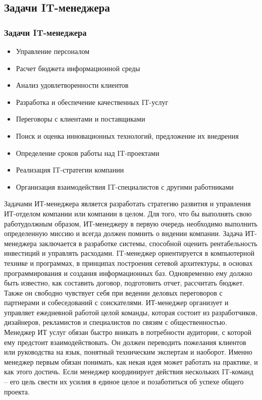 \documentclass{../industrial-development}
\begin{document}
{\subsection{Задачи IT-менеджера}
\begin{frame} \frametitle{Задачи IT-менеджера}
\begin{itemize}	
		\item Управление персоналом
		\item Расчет бюджета информационной среды
	 	\item Анализ удовлетворенности клиентов
	 	\item Разработка и обеспечение качественных IT-услуг
		\item Переговоры с клиентами и поставщиками
	 	\item Поиск и оценка инновационных технологий, предложение их внедрения
	 	\item Определение сроков работы над IT-проектами
	           \item Реализация IT-стратегии компании
		\item Организация взаимодействия IT-специалистов с другими работниками
 \end{itemize}
\end{frame}
\lecturenotes
Задачами ИТ-менеджера является разработать стратегию развития и управления ИТ-отделом компании или компании в целом. Для того, что бы выполнять свою работудолжным образом, ИТ-менеджеру в первую очередь необходимо выполнить определенную миссию и всегда должен помнить о видении компании. Задача ИТ-менеджера заключается в разработке системы, способной оценить рентабельность инвестиций и управлять расходами. 
IT-менеджер ориентируется в компьютерной технике и программах, в принципах построения сетевой архитектуры, в основах программирования и создания информационных баз. Одновременно ему должно быть известно, как составить договор, подготовить отчет, рассчитать бюджет. Также он свободно чувствует себя при ведении деловых переговоров с партнерами и собеседований с соискателями. 
ИТ-менеджер организует и управляет ежедневной работой целой команды, которая состоит из разработчиков, дизайнеров, рекламистов и специалистов по связям с общественностью. 
Менеджер ИТ услуг обязан быстро вникать в потребности аудитории, с которой ему предстоит взаимодействовать. Он должен переводить пожелания клиентов или руководства на язык, понятный техническим экспертам и наоборот. Именно менеджер первым обязан понимать, как некая идея может работать на практике, и как этого достичь. Если менеджер координирует действия нескольких IT-команд – его цель свести их усилия в единое целое и позаботиться об успехе общего проекта.

}
\end{document}
